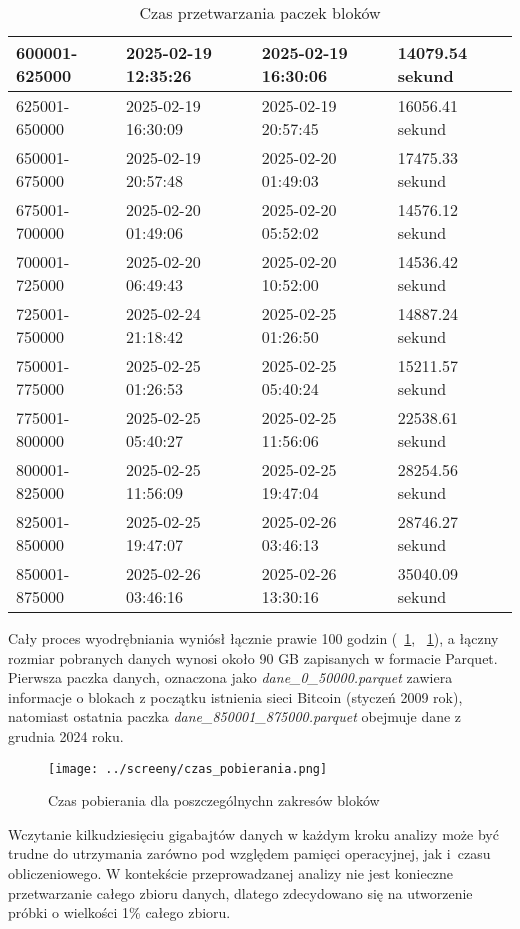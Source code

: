 \documentclass[12pt,a4paper]{report}
\theoremstyle{definition} %
\begin{document}
\begin{table}[H]
\begin{tabular}{|l|l|l|l|}
	        600001-625000 & 2025-02-19 12:35:26 & 2025-02-19 16:30:06 & 14079.54 sekund \\ \hline
	        625001-650000 & 2025-02-19 16:30:09 & 2025-02-19 20:57:45 & 16056.41 sekund \\ \hline
	        650001-675000 & 2025-02-19 20:57:48 & 2025-02-20 01:49:03 & 17475.33 sekund \\ \hline
	        675001-700000 & 2025-02-20 01:49:06 & 2025-02-20 05:52:02 & 14576.12 sekund \\ \hline
	        700001-725000 & 2025-02-20 06:49:43 & 2025-02-20 10:52:00 & 14536.42 sekund \\ \hline
	        725001-750000 & 2025-02-24 21:18:42 & 2025-02-25 01:26:50 & 14887.24 sekund \\ \hline
	        750001-775000 & 2025-02-25 01:26:53 & 2025-02-25 05:40:24 & 15211.57 sekund \\ \hline
	        775001-800000 & 2025-02-25 05:40:27 & 2025-02-25 11:56:06 & 22538.61 sekund \\ \hline
	        800001-825000 & 2025-02-25 11:56:09 & 2025-02-25 19:47:04 & 28254.56 sekund \\ \hline
	        825001-850000 & 2025-02-25 19:47:07 & 2025-02-26 03:46:13 & 28746.27 sekund \\ \hline
	        850001-875000 & 2025-02-26 03:46:16 & 2025-02-26 13:30:16 & 35040.09 sekund \\ \hline
	    \end{tabular}
	    \caption{Czas przetwarzania paczek bloków}
	    \label{fig:tabela}
	\end{table}

	\enlargethispage{2\baselineskip}Cały proces wyodrębniania wyniósł łącznie prawie 100 godzin (\tablename~\ref{fig:tabela}, \figurename~\ref{fig:zakresBlokow}), a łączny rozmiar pobranych danych wynosi około 90 GB zapisanych w formacie Parquet. Pierwsza paczka danych, oznaczona jako \textit{dane\_0\_50000.parquet} zawiera informacje o blokach z początku istnienia sieci Bitcoin (styczeń 2009 rok), natomiast ostatnia paczka \textit{dane\_850001\_875000.parquet} obejmuje dane z grudnia 2024 roku. 

	\begin{figure}[H]
	    \centering
	    \texttt{[image: ../screeny/czas\_pobierania.png]} 
	    \caption{Czas pobierania dla poszczególnychn zakresów bloków}
	    \label{fig:zakresBlokow}
	\end{figure}
	
	Wczytanie kilkudziesięciu gigabajtów danych w każdym kroku analizy może być trudne do utrzymania zarówno pod względem pamięci operacyjnej, jak i~czasu obliczeniowego. W kontekście przeprowadzanej analizy nie jest konieczne przetwarzanie całego zbioru danych, dlatego zdecydowano się na utworzenie próbki o wielkości 1\% całego zbioru.
	
\end{document}
